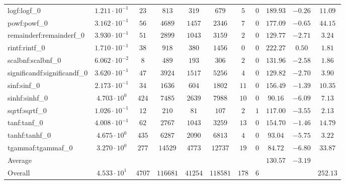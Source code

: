 \begin{tabular}{|l|c|c|c|c|c|c|c|c|c|c|}
logf:logf\_0                 & $ 1.211 \cdot 10^{-1} $ & $ 23     $ & $ 813    $ & $ 319   $ & $ 679    $ & $ 5   $ & $ 0 $ & $ 189.93      $ & $ -0.26   $ & $ 11.09   $ \\
powf:powf\_0                 & $ 3.162 \cdot 10^{-1} $ & $ 56     $ & $ 4689   $ & $ 1457  $ & $ 2346   $ & $ 7   $ & $ 0 $ & $ 177.09      $ & $ -0.65   $ & $ 44.15   $ \\
remainderf:remainderf\_0     & $ 3.930 \cdot 10^{-1} $ & $ 51     $ & $ 2899   $ & $ 1043  $ & $ 3159   $ & $ 2   $ & $ 0 $ & $ 129.77      $ & $ -2.71   $ & $ 3.24    $ \\
rintf:rintf\_0               & $ 1.710 \cdot 10^{-1} $ & $ 38     $ & $ 918    $ & $ 380   $ & $ 1456   $ & $ 0   $ & $ 0 $ & $ 222.27      $ & $ 0.50    $ & $ 1.81    $ \\
scalbnf:scalbnf\_0           & $ 6.062 \cdot 10^{-2} $ & $ 8      $ & $ 489    $ & $ 193   $ & $ 306    $ & $ 2   $ & $ 0 $ & $ 131.96      $ & $ -2.58   $ & $ 1.86    $ \\
significandf:significandf\_0 & $ 3.620 \cdot 10^{-1} $ & $ 47     $ & $ 3924   $ & $ 1517  $ & $ 5256   $ & $ 4   $ & $ 0 $ & $ 129.82      $ & $ -2.70   $ & $ 3.90    $ \\
sinf:sinf\_0                 & $ 2.173 \cdot 10^{-1} $ & $ 34     $ & $ 1636   $ & $ 604   $ & $ 1802   $ & $ 11  $ & $ 0 $ & $ 156.49      $ & $ -1.39   $ & $ 10.35   $ \\
sinhf:sinhf\_0               & $ 4.703 \cdot 10^{0}  $ & $ 424    $ & $ 7485   $ & $ 2639  $ & $ 7988   $ & $ 10  $ & $ 0 $ & $ 90.16       $ & $ -6.09   $ & $ 7.13    $ \\
sqrtf:sqrtf\_0               & $ 1.026 \cdot 10^{-1} $ & $ 12     $ & $ 210    $ & $ 81    $ & $ 107    $ & $ 2   $ & $ 1 $ & $ 117.00      $ & $ -3.55   $ & $ 2.13    $ \\
tanf:tanf\_0                 & $ 4.008 \cdot 10^{-1} $ & $ 62     $ & $ 2767   $ & $ 1043  $ & $ 3259   $ & $ 13  $ & $ 0 $ & $ 154.70      $ & $ -1.46   $ & $ 14.79   $ \\
tanhf:tanhf\_0               & $ 4.675 \cdot 10^{0}  $ & $ 435    $ & $ 6287   $ & $ 2090  $ & $ 6813   $ & $ 4   $ & $ 0 $ & $ 93.04       $ & $ -5.75   $ & $ 3.22    $ \\
tgammaf:tgammaf\_0           & $ 3.270 \cdot 10^{0}  $ & $ 277    $ & $ 14529  $ & $ 4773  $ & $ 12737  $ & $ 19  $ & $ 0 $ & $ 84.72       $ & $ -6.80   $ & $ 33.87   $ \\
\hline
Average                      & $                     $ & $        $ & $        $ & $       $ & $        $ & $     $ & $   $ & $ 130.57      $ & $ -3.19   $ & $         $ \\
\hline
Overall                      & $ 4.533 \cdot 10^{1}  $ & $ 4707   $ & $ 116681 $ & $ 41254 $ & $ 118581 $ & $ 178 $ & $ 6 $ & $             $ & $         $ & $ 252.13  $ \\
\hline
\end{tabular}

